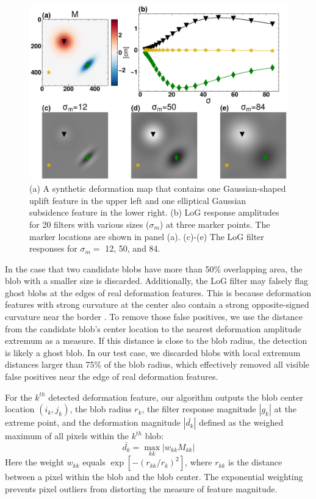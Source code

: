 \documentclass{utexasthesis}
\begin{document}
\begin{figure}[hbt!]
	\centering
	\includegraphics[width=0.98\linewidth]{paper2/figures/figure2_log_response.pdf}
	\caption[LoG filter responses to synthetic deformation]{
		(a) A synthetic deformation map that contains one Gaussian-shaped uplift feature in the upper left and one elliptical Gaussian subsidence feature in the lower right. (b) LoG response amplitudes for 20 filters with various sizes ($\sigma_m$) at three marker points. The marker locations are shown in panel (a). (c)-(e) The LoG filter responses for $\sigma_m=$ 12, 50, and 84.}
	\label{fig:log-response}
\end{figure}

In the case that two candidate blobs have more than 50\% overlapping area, the blob with a smaller size is discarded. 
Additionally, the LoG filter may falsely flag ghost blobs at the edges of real deformation features. This is because deformation features with strong curvature at the center also contain a strong opposite-signed curvature near the border \cite{Lindeberg1998FeatureDetectionAutomatic}. To remove those false positives, we use the distance from the candidate blob's center location to the nearest deformation amplitude extremum as a measure. If this distance is close to the blob radius, the detection is likely a ghost blob. In our test case, we discarded blobs with local extremum distances larger than 75$\%$ of the blob radius, which effectively removed all visible false positives near the edge of real deformation features.

For the $k^{th}$ detected deformation feature, our algorithm outputs the blob center location $(i_k, j_k)$, the blob radius $ r_k$, the filter response magnitude $|g_k|$ at the extreme point, and the deformation magnitude $|\bar{d_k}|$ defined as the weighed maximum of all pixels within the $k^{th}$ blob:
\begin{equation}
	\bar{d_k} = \max_{kk} |w_{kk} M_{kk} | 
\end{equation}
Here the weight $w_{kk}$ equals $\exp\left[-(r_{kk} / r_k)^2\right]$, where $r_{kk}$ is the distance between a pixel within the blob and the blob center. The exponential weighting prevents pixel outliers from distorting the measure of feature magnitude. 
\end{document}
